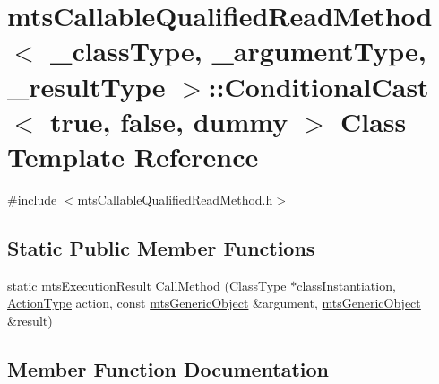 \hypertarget{classmts_callable_qualified_read_method_1_1_conditional_cast_3_01true_00_01false_00_01dummy_01_4}{}\section{mts\+Callable\+Qualified\+Read\+Method$<$ \+\_\+class\+Type, \+\_\+argument\+Type, \+\_\+result\+Type $>$\+:\+:Conditional\+Cast$<$ true, false, dummy $>$ Class Template Reference}
\label{classmts_callable_qualified_read_method_1_1_conditional_cast_3_01true_00_01false_00_01dummy_01_4}


{\ttfamily \#include $<$mts\+Callable\+Qualified\+Read\+Method.\+h$>$}

\subsection*{Static Public Member Functions}
\begin{DoxyCompactItemize}
\item 
static mts\+Execution\+Result \hyperlink{classmts_callable_qualified_read_method_1_1_conditional_cast_3_01true_00_01false_00_01dummy_01_4_a961446b0b2cd05bcb2a419fc781f43e8}{Call\+Method} (\hyperlink{classmts_callable_qualified_read_method_a6cfee5c3c3c49c691c2f5176ea79d735}{Class\+Type} $\ast$class\+Instantiation, \hyperlink{classmts_callable_qualified_read_method_a6327de6d1017295be394178d8e03b121}{Action\+Type} action, const \hyperlink{classmts_generic_object}{mts\+Generic\+Object} \&argument, \hyperlink{classmts_generic_object}{mts\+Generic\+Object} \&result)
\end{DoxyCompactItemize}


\subsection{Member Function Documentation}
\hypertarget{classmts_callable_qualified_read_method_1_1_conditional_cast_3_01true_00_01false_00_01dummy_01_4_a961446b0b2cd05bcb2a419fc781f43e8}{}
